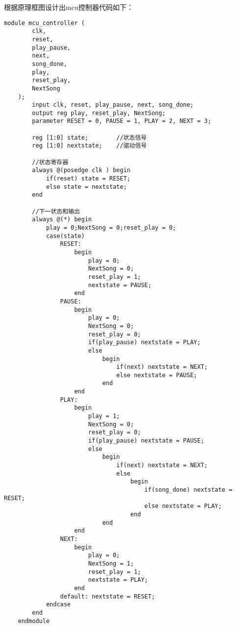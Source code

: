 \documentclass{../source/Experiment}
\begin{document}
                根据原理框图设计出mcu控制器代码如下：
                \begin{lstlisting}[name = mcu控制器代码]
    module mcu_controller (
        clk,
        reset,
        play_pause,
        next,
        song_done,
        play,
        reset_play,
        NextSong    
    );
        input clk, reset, play_pause, next, song_done;
        output reg play, reset_play, NextSong;
        parameter RESET = 0, PAUSE = 1, PLAY = 2, NEXT = 3;

        reg [1:0] state;        //状态信号
        reg [1:0] nextstate;    //驱动信号

        //状态寄存器
        always @(posedge clk ) begin
            if(reset) state = RESET;
            else state = nextstate;
        end

        //下一状态和输出
        always @(*) begin
            play = 0;NextSong = 0;reset_play = 0;
            case(state)
                RESET:
                    begin 
                        play = 0;
                        NextSong = 0;
                        reset_play = 1;
                        nextstate = PAUSE; 
                    end
                PAUSE:
                    begin
                        play = 0;
                        NextSong = 0;
                        reset_play = 0;
                        if(play_pause) nextstate = PLAY;
                        else
                            begin
                                if(next) nextstate = NEXT;
                                else nextstate = PAUSE;
                            end 
                    end
                PLAY:
                    begin
                        play = 1;
                        NextSong = 0;
                        reset_play = 0;
                        if(play_pause) nextstate = PAUSE;
                        else 
                            begin
                                if(next) nextstate = NEXT;
                                else 
                                    begin
                                        if(song_done) nextstate = RESET;
                                        else nextstate = PLAY;
                                    end
                            end
                    end
                NEXT:
                    begin 
                        play = 0;
                        NextSong = 1;
                        reset_play = 1;
                        nextstate = PLAY;
                    end
                default: nextstate = RESET;
            endcase
        end
    endmodule
                \end{lstlisting}
\end{document}
